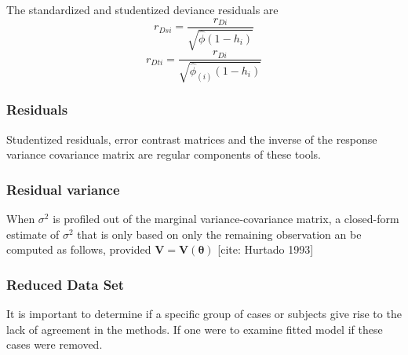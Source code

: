 \documentclass[12pt, a4paper]{report}
\theoremstyle{plain}
\theoremstyle{definition}
\theoremstyle{remark}
\begin{document}
	
	The standardized and studentized deviance residuals are
	\[
	r_{Dsi} = \frac{r_{Di}}{\sqrt{\hat{ \phi} (1- h_{i})} }\]
	\[r_{Dti} = \frac{r_{Di}}{\sqrt{ \hat{ \phi}_{(i)}
			(1- h_{i})}}\]
	
	
	
	\subsubsection*{Residuals}
	Studentized residuals, error contrast matrices and the inverse of the response variance covariance matrix are regular components of these tools.

	
	
	
	

	\subsubsection{Residual variance}
	When $\sigma^2$ is profiled out of the marginal variance-covariance matrix, a closed-form estimate of $\sigma^2$ that is only based on only the remaining observation
	an be computed as follows, provided $\boldsymbol{V} = \boldsymbol{V}(\boldsymbol{\theta}) $
	[cite: Hurtado 1993]

	\subsubsection{Reduced Data Set}
	It is important to determine if a specific group of cases or subjects give rise to the lack of agreement in the methods. If one were to examine fitted model if these cases were removed.
	
	
\end{document}

